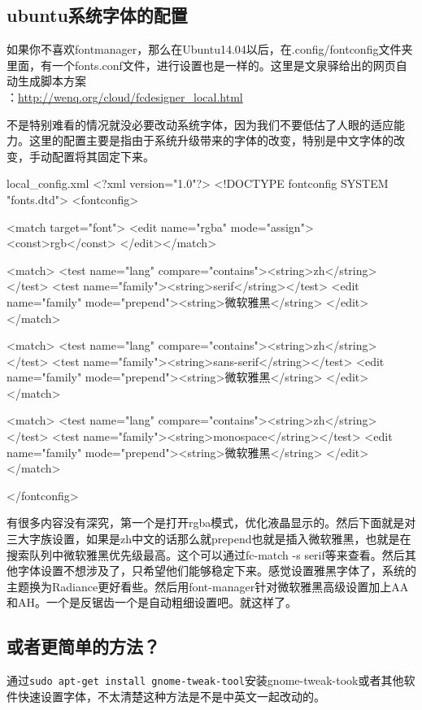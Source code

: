 \documentclass[12pt,oneside]{book}
\begin{document}
\begin{common-format}
\section{ubuntu系统字体的配置}
如果你不喜欢fontmanager，那么在Ubuntu14.04以后，在\linebreak .config/fontconfig文件夹里面，有一个fonts.conf文件，进行设置也是一样的。这里是文泉驿给出的网页自动生成脚本方案\\：\href{http://wenq.org/cloud/fcdesigner_local.html}{http://wenq.org/cloud/fcdesigner\_local.html}

不是特别难看的情况就没必要改动系统字体，因为我们不要低估了人眼的适应能力。这里的配置主要是指由于系统升级带来的字体的改变，特别是中文字体的改变，手动配置将其固定下来。
\begin{xverbatim}{local_config.xml}
<?xml version="1.0"?>
<!DOCTYPE fontconfig SYSTEM "fonts.dtd">
<fontconfig>

<match target="font">
	<edit name="rgba" mode="assign"><const>rgb</const>
	</edit></match>

<match>
	<test name="lang" compare="contains"><string>zh</string></test>
	<test name="family"><string>serif</string></test>
	<edit name="family" mode="prepend"><string>微软雅黑</string>
	</edit></match>

<match>
	<test name="lang" compare="contains"><string>zh</string></test>
	<test name="family"><string>sans-serif</string></test>
	<edit name="family" mode="prepend"><string>微软雅黑</string>
	</edit></match>

<match>
	<test name="lang" compare="contains"><string>zh</string></test>
	<test name="family"><string>monospace</string></test>
	<edit name="family" mode="prepend"><string>微软雅黑</string>
	</edit></match>	

</fontconfig>
\end{xverbatim}
有很多内容没有深究，第一个是打开rgba模式，优化液晶显示的。然后下面就是对三大字族设置，如果是zh中文的话那么就prepend也就是插入微软雅黑，也就是在搜索队列中微软雅黑优先级最高。这个可以通过fc-match  -s  serif等来查看。然后其他字体设置不想涉及了，只希望他们能够稳定下来。感觉设置雅黑字体了，系统的主题换为Radiance更好看些。然后用font-manager针对微软雅黑高级设置加上AA和AH。一个是反锯齿一个是自动粗细设置吧。就这样了。

\subsection{或者更简单的方法？}
通过\verb+sudo apt-get install gnome-tweak-tool+安装gnome-tweak-took或者其他软件快速设置字体，不太清楚这种方法是不是中英文一起改动的。
 



\end{common-format}
\end{document}

